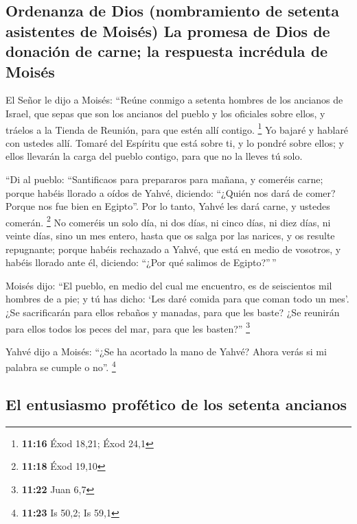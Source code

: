 \begin{paracol}{2}
\hypertarget{ordenanza-de-dios-nombramiento-de-setenta-asistentes-de-moisuxe9s-la-promesa-de-dios-de-donaciuxf3n-de-carne-la-respuesta-incruxe9dula-de-moisuxe9s}{%
\subsection{Ordenanza de Dios (nombramiento de setenta asistentes de
Moisés) La promesa de Dios de donación de carne; la respuesta incrédula
de
Moisés}\label{ordenanza-de-dios-nombramiento-de-setenta-asistentes-de-moisuxe9s-la-promesa-de-dios-de-donaciuxf3n-de-carne-la-respuesta-incruxe9dula-de-moisuxe9s}}

 El Señor le dijo a Moisés: ``Reúne conmigo a setenta
hombres de los ancianos de Israel, que sepas que son los ancianos del
pueblo y los oficiales sobre ellos, y tráelos a la Tienda de Reunión,
para que estén allí contigo. \footnote{\textbf{11:16} Éxod 18,21; Éxod
  24,1}  Yo bajaré y hablaré con ustedes allí. Tomaré del
Espíritu que está sobre ti, y lo pondré sobre ellos; y ellos llevarán la
carga del pueblo contigo, para que no la lleves tú solo.

 ``Di al pueblo: ``Santificaos para prepararos para
mañana, y comeréis carne; porque habéis llorado a oídos de Yahvé,
diciendo: ``¿Quién nos dará de comer? Porque nos fue bien en Egipto''.
Por lo tanto, Yahvé les dará carne, y ustedes comerán. \footnote{\textbf{11:18}
  Éxod 19,10}  No comeréis un solo día, ni dos días, ni
cinco días, ni diez días, ni veinte días,  sino un mes
entero, hasta que os salga por las narices, y os resulte repugnante;
porque habéis rechazado a Yahvé, que está en medio de vosotros, y habéis
llorado ante él, diciendo: ``¿Por qué salimos de Egipto?''\,''

 Moisés dijo: ``El pueblo, en medio del cual me
encuentro, es de seiscientos mil hombres de a pie; y tú has dicho: `Les
daré comida para que coman todo un mes'.  ¿Se
sacrificarán para ellos rebaños y manadas, para que les baste? ¿Se
reunirán para ellos todos los peces del mar, para que les basten?''
\footnote{\textbf{11:22} Juan 6,7}

 Yahvé dijo a Moisés: ``¿Se ha acortado la mano de Yahvé?
Ahora verás si mi palabra se cumple o no''. \footnote{\textbf{11:23} Is
  50,2; Is 59,1}

\hypertarget{el-entusiasmo-profuxe9tico-de-los-setenta-ancianos}{%
\subsection{El entusiasmo profético de los setenta
ancianos}\label{el-entusiasmo-profuxe9tico-de-los-setenta-ancianos}}


\end{paracol}
